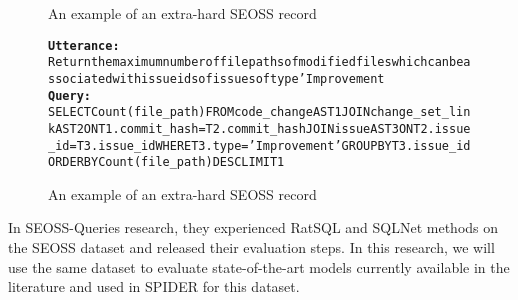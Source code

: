 \begin{figure}[H]
    \label{fig:SESS2}
    \begin{AIbox}{An example of an extra-hard SEOSS record}
        \vspace{-5px}
        \parbox{1\textwidth}{\scriptsize
        \begin{alltt} 
            {\bf Utterance:} \\ 
            Return  the maximum number of file paths of modified files which can be associated with issue ids of issues of type 'Improvement
            \\
            {\bf Query:} \\
            SELECT Count(file\_path) FROM code\_change AS T1 JOIN change\_set\_link AS T2 ON T1.commit\_hash = T2.commit\_hash JOIN issue AS T3 ON T2.issue\_id = T3.issue\_id WHERE T3.type = 'Improvement' GROUP BY T3.issue\_id ORDER BY Count(file\_path) DESC LIMIT 1
        \end{alltt}
        }
        \vspace{-5px}
    \end{AIbox}
    
    \caption{An example of an extra-hard SEOSS record}
\end{figure}

In SEOSS-Queries\cite{TOMOVA2022108211} research, they experienced RatSQL and SQLNet methods on the SEOSS dataset and released their evaluation steps. In this research, we will use the same dataset to evaluate state-of-the-art models currently available in the literature and used in SPIDER for this dataset.
